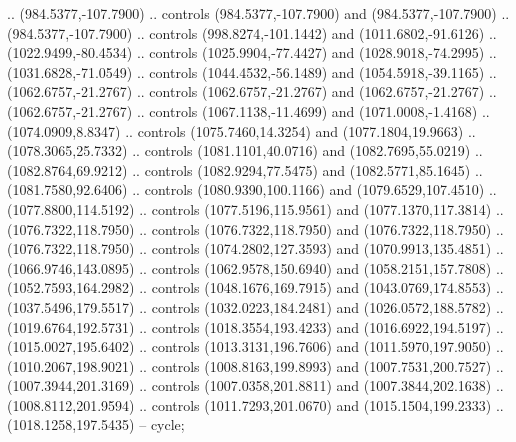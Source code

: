 \begin{scope}[shift={(-22.88722,-49.76189)}]
\begin{scope}[shift={(-739.46591,328.36782)}]
      .. (984.5377,-107.7900) .. controls (984.5377,-107.7900) and
      (984.5377,-107.7900) .. (984.5377,-107.7900) .. controls (998.8274,-101.1442)
      and (1011.6802,-91.6126) .. (1022.9499,-80.4534) .. controls
      (1025.9904,-77.4427) and (1028.9018,-74.2995) .. (1031.6828,-71.0549) ..
      controls (1044.4532,-56.1489) and (1054.5918,-39.1165) .. (1062.6757,-21.2767)
      .. controls (1062.6757,-21.2767) and (1062.6757,-21.2767) ..
      (1062.6757,-21.2767) .. controls (1067.1138,-11.4699) and (1071.0008,-1.4168)
      .. (1074.0909,8.8347) .. controls (1075.7460,14.3254) and (1077.1804,19.9663)
      .. (1078.3065,25.7332) .. controls (1081.1101,40.0716) and (1082.7695,55.0219)
      .. (1082.8764,69.9212) .. controls (1082.9294,77.5475) and (1082.5771,85.1645)
      .. (1081.7580,92.6406) .. controls (1080.9390,100.1166) and
      (1079.6529,107.4510) .. (1077.8800,114.5192) .. controls (1077.5196,115.9561)
      and (1077.1370,117.3814) .. (1076.7322,118.7950) .. controls
      (1076.7322,118.7950) and (1076.7322,118.7950) .. (1076.7322,118.7950) ..
      controls (1074.2802,127.3593) and (1070.9913,135.4851) .. (1066.9746,143.0895)
      .. controls (1062.9578,150.6940) and (1058.2151,157.7808) ..
      (1052.7593,164.2982) .. controls (1048.1676,169.7915) and (1043.0769,174.8553)
      .. (1037.5496,179.5517) .. controls (1032.0223,184.2481) and
      (1026.0572,188.5782) .. (1019.6764,192.5731) .. controls (1018.3554,193.4233)
      and (1016.6922,194.5197) .. (1015.0027,195.6402) .. controls
      (1013.3131,196.7606) and (1011.5970,197.9050) .. (1010.2067,198.9021) ..
      controls (1008.8163,199.8993) and (1007.7531,200.7527) .. (1007.3944,201.3169)
      .. controls (1007.0358,201.8811) and (1007.3844,202.1638) ..
      (1008.8112,201.9594) .. controls (1011.7293,201.0670) and (1015.1504,199.2333)
      .. (1018.1258,197.5435) -- cycle;


\end{scope}
\end{scope}
